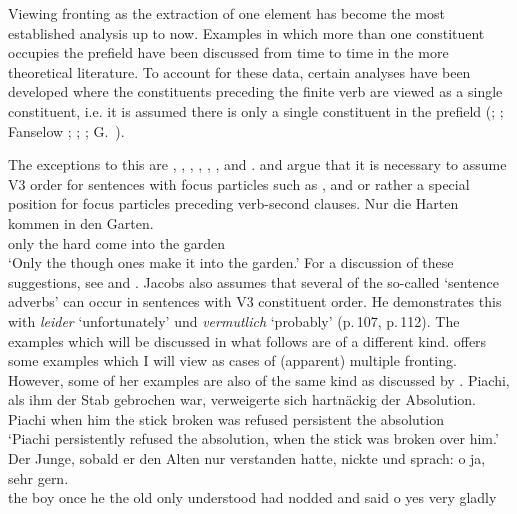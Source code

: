 Viewing fronting as the extraction of one element has become the most established analysis up to now.
Examples in which more than one constituent occupies the prefield have been discussed from time to time in the 
more theoretical literature. To account for these data, certain analyses have been developed where the 
constituents preceding the finite verb are viewed as a single constituent, i.e. it is assumed there is 
only a single constituent in the prefield (\citealp[]{Haider82}; \citealp[]{Wunderlich84}; 
Fanselow \citeyear[--100]{Fanselow87a}; \citeyear[Chapter~3]{Fanselow93a}; \citealp[]{Hoberg97a}; G.\ \citealp[Chapter~5.3]{GMueller98a}).

The exceptions to this are \citet{Grubacic65a}, \citet{Lee75a}, \citet{Loetscher85}, \citet[]{Eisenberg94a}, \citet{Jacobs86a}, \citet{BH2001a}, and \citet{Speyer2008a}. 
\citet{Jacobs86a} and \citet{BH2001a} argue that it is necessary to assume V3 order for sentences with focus particles such as ,  and  or rather
a special position for focus particles preceding verb-second clauses.
\ea
\label{ex-v3-particles-jacobs}
\gll Nur die Harten kommen in den Garten.\\
     only the hard come into the garden\\
\glt `Only the though ones make it into the garden.'
\z
For a discussion of these suggestions, see  and .
Jacobs also assumes that several of the so-called `sentence adverbs' can occur in sentences with V3 constituent order.
He demonstrates this with \emph{leider} `unfortunately' und \emph{vermutlich} `probably' (p.\,107, p.\,112).
The examples which will be discussed in what follows are of a different kind. \citet{Grubacic65a} offers some examples which
I will view as cases of (apparent) multiple fronting. However, some of her examples are also of the same kind as discussed by \citet{Lee75a}.
\eal
\ex 
\gll Piachi, als ihm der Stab gebrochen war, verweigerte sich hartnäckig der Absolution.\footnotemark\\
     Piachi  when him the stick broken was   refused     \self{} persistent the absolution\\
\glt `Piachi persistently refused the absolution, when the stick was broken over him.'
\ex  
\gll Der Junge, sobald er den Alten nur verstanden hatte, nickte und sprach: o ja, sehr gern.\footnotemark\\
     the boy    once   he the old only understood had    nodded and said    o yes very gladly\\
